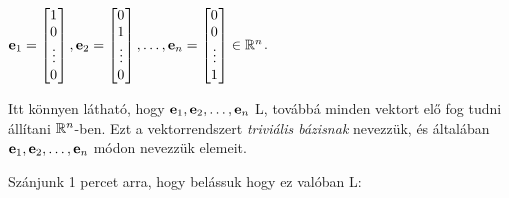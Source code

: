 \documentclass[a4paper,11.5pt]{article}
\begin{document}
	{\centering 
		$\e _1=\begin{bmatrix}
		1\s \\
		0\s \\
		\vdots\\
		0\s \\
		\end{bmatrix},
		\e _2=\begin{bmatrix}
		0\s \\
		1\s \\
		\vdots\\
		0\s \\
		\end{bmatrix}, \dots ,
		\e _n=\begin{bmatrix}
		0\s \\
		0\s \\
		\vdots\\
		1\s \\
		\end{bmatrix} \in \Rn$.
		\par}
	
	\noindent Itt könnyen látható, hogy $\textbf{e}_1, \textbf{e}_2, \ldots, \textbf{e}_n$ L, továbbá minden vektort elő fog tudni állítani $\mathbb{R}^{n}$-ben. Ezt a vektorrendszert \emph{triviális bázisnak} nevezzük, és általában $\textbf{e}_1, \textbf{e}_2, \ldots, \textbf{e}_n$ módon nevezzük elemeit.
	
	Szánjunk 1 percet arra, hogy belássuk hogy ez valóban L:
	
\end{document}
